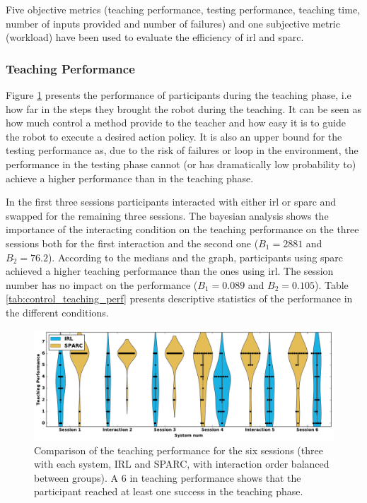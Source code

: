 Five objective metrics (teaching performance, testing performance, teaching time, number of inputs provided and number of failures) and one subjective metric (workload) have been used to evaluate the efficiency of \gls{irl} and \gls{sparc}. 

\subsubsection{Teaching Performance}

Figure \ref{fig:control_teaching_performance} presents the performance of participants during the teaching phase, i.e how far in the steps they brought the robot during the teaching. It can be seen as how much control a method provide to the teacher and how easy it is to guide the robot to execute a desired action policy. It is also an upper bound for the testing performance as, due to the risk of failures or loop in the environment, the performance in the testing phase cannot (or has dramatically low probability to) achieve a higher performance than in the teaching phase.

In the first three sessions participants interacted with either \gls{irl} or \gls{sparc} and swapped for the remaining three sessions. The bayesian analysis shows the importance of the interacting condition on the teaching performance on the three sessions both for the first interaction and the second one ($B_1=2881$ and $B_2 = 76.2$). According to the medians and the graph, participants using \gls{sparc} achieved a higher teaching performance than the ones using \gls{irl}. The session number has no impact on the performance ($B_1=0.089$ and $B_2=0.105$). Table \ref{tab:control_teaching_perf} presents descriptive statistics of the performance in the different conditions.


\begin{figure}[ht]
	\includegraphics[width=\textwidth]{teaching_performance.pdf}
	\centering
	\caption{Comparison of the teaching performance for the six sessions (three with each system, IRL and SPARC, with interaction order balanced between groups). A 6 in teaching performance shows that the participant reached at least one success in the teaching phase.
	}
	\label{fig:control_teaching_performance}
\end{figure}

